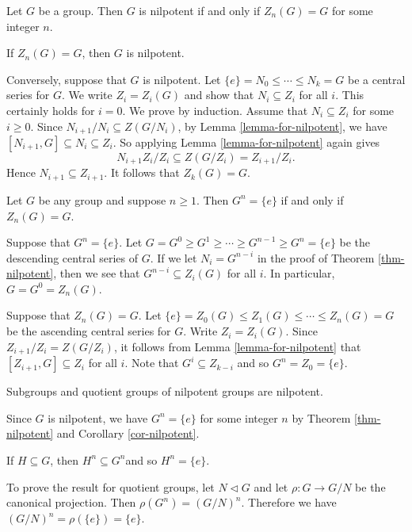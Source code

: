  \begin{theorem} \label{thm-nilpotent}
 	 Let $G$ be a group. Then $G$ is nilpotent if and only if  $Z_n(G) = G$ for some integer $n$.
 \end{theorem}
 \begin{sketch}
  	If $Z_n(G) = G$, then $G$ is nilpotent.
  	
  	Conversely,  suppose that $G$ is nilpotent.  Let $\{e\} = N_0 \leq \cdots \leq N_k = G$ be a central series for $G$. We write $Z_i = Z_i(G)$ and show that $N_i \subseteq Z_i$ for all $i$. This certainly holds for $i = 0$. We prove by induction.  Assume that $N_{i} \subseteq Z_{i}$ for some $i\geq 0$. Since $N_{i+1}/N_i \subseteq Z(G/N_i)$, by Lemma \ref{lemma-for-nilpotent}, we have $[N_{i+1}, G] \subseteq N_{i} \subseteq Z_{i}$. So applying Lemma \ref{lemma-for-nilpotent} again gives
 	\[ N_{i+1} Z_{i}/Z_{i} \subseteq Z(G/Z_{i}) = Z_{i+1}/Z_{i}.\]
 	Hence $N_{i+1} \subseteq Z_{i+1}$.   It follows that $Z_k(G) = G$.
 \end{sketch}
 
 
 
\begin{corollary} \label{cor-nilpotent}
	Let $G$ be any group and suppose $n \geq 1$. Then $G^{n} = \{e\}$ if and only if $Z_n(G) = G$.
\end{corollary}
\begin{sketch}
	Suppose that $G^{n} = \{e\}$. Let 
	$G=G^0 \geq  G^{1}\geq \cdots \geq G^{n-1} \geq G^n = \{e\}$  be the descending central series of $G$. If we let $N_{i} = G^{n-i}$ in the proof of Theorem \ref{thm-nilpotent}, then we see that $G^{n-i}\subseteq Z_i(G)$ for all $i$. In particular, $G = G^0 = Z_n(G)$.
	
	Suppose that $Z_n(G) =G$. Let $\{e\} = Z_0(G) \leq Z_1(G) \leq \cdots \leq Z_n(G) = G$ be the ascending central series for $G$. Write $Z_i = Z_i(G)$. Since $Z_{i+1}/Z_i = Z(G/Z_i)$, it follows from Lemma \ref{lemma-for-nilpotent} that  $[Z_{i+1}, G] \subseteq Z_i$ for all $i$. Note that $G^i \subseteq Z_{k-i}$ and so $G^{n} = Z_0 = \{e\}$.
\end{sketch}



\begin{corollary}
	Subgroups and quotient groups of nilpotent groups are nilpotent.
\end{corollary}
\begin{sketch}
	Since $G$ is nilpotent, we have $G^n = \{e\}$ for some integer $n$ by Theorem \ref{thm-nilpotent} and Corollary \ref{cor-nilpotent}. 
	
	If $H \subseteq G$, then $H^n \subseteq G^n$and so $H^n = \{e\}$.
	
	To prove the result for quotient groups, let $N \lhd G$ and let $\rho : G \rightarrow G/N$ be the canonical projection. Then $\rho(G^n) = (G/N)^n$. Therefore we have $(G/N)^n = \rho(\{e\}) =\{e\}$. 
\end{sketch}

